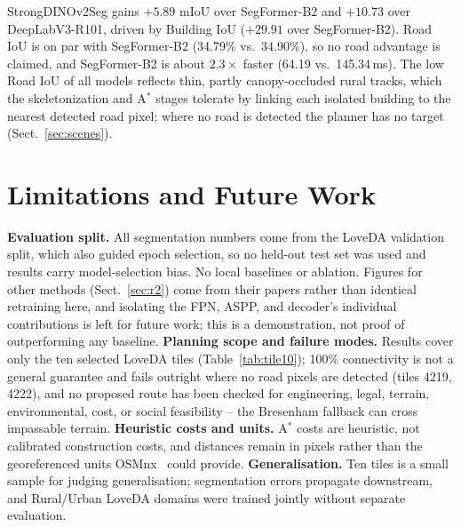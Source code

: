 \begin{table}[t]
\caption{Baselines fine-tuned on LoveDA, scored on the 100-tile Rural validation subset (not the full validation split of Table~\ref{tab:seg}); T4 GPU, $560\times560$, latency mean $\pm$ std.}\label{tab:sota}
\centering
{}
\end{table}

StrongDINOv2Seg gains $+5.89$ mIoU over SegFormer-B2 and $+10.73$ over DeepLabV3-R101, driven by Building IoU ($+29.91$ over SegFormer-B2). Road IoU is on par with SegFormer-B2 (34.79\% vs.\ 34.90\%), so no road advantage is claimed, and SegFormer-B2 is about $2.3\times$ faster (64.19 vs.\ 145.34\,ms). The low Road IoU of all models reflects thin, partly canopy-occluded rural tracks, which the skeletonization and A$^{*}$ stages tolerate by linking each isolated building to the nearest detected road pixel; where no road is detected the planner has no target (Sect.~\ref{sec:scenes}).

\section{Limitations and Future Work}
\textbf{Evaluation split.} All segmentation numbers come from the LoveDA validation split, which also guided epoch selection, so no held-out test set was used and results carry model-selection bias. %
No local baselines or ablation. Figures for other methods (Sect.~\ref{sec:r2}) come from their papers rather than identical retraining here, and isolating the FPN, ASPP, and decoder's individual contributions is left for future work; this is a demonstration, not proof of outperforming any baseline. %
\textbf{Planning scope and failure modes.} Results cover only the ten selected LoveDA tiles (Table~\ref{tab:tile10}); 100\% connectivity is not a general guarantee and fails outright where no road pixels are detected (tiles 4219, 4222), and no proposed route has been checked for engineering, legal, terrain, environmental, cost, or social feasibility -- the Bresenham fallback can cross impassable terrain. \textbf{Heuristic costs and units.} A$^{*}$ costs are heuristic, not calibrated construction costs, and distances remain in pixels rather than the georeferenced units OSMnx~\cite{boeing2017} could provide. \textbf{Generalisation.} Ten tiles is a small sample for judging generalisation; segmentation errors propagate downstream, and Rural/Urban LoveDA domains were trained jointly without separate evaluation.

